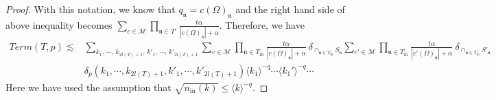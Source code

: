 \begin{proof}
With this notation, we know that $q_{\mathfrak{n}}=c(\Omega)_{\mathfrak{n}}$ and the right hand side of above inequality becomes $\sum_{c\in \mathscr{M} }\prod_{\mathfrak{n}\in T'} \frac{t\alpha}{|c(\Omega)_{\mathfrak{n}}|+\alpha}$. Therefore, we have
\begin{equation}
\begin{split}
    Term(T, p)\lesssim& \sum_{k_1,\, \cdots,\, k_{2l(T)+1},\, k'_1,\, \cdots,\, k'_{2l(T)+1}} \sum_{c\in \mathscr{M} }\prod_{\mathfrak{n}\in T_{\text{in}}}\frac{t\alpha}{|c(\Omega)_{\mathfrak{n}}|+\alpha}\ \delta_{\cap_{\mathfrak{n}\in T_{\text{in}}} S_{\mathfrak{n}}} \sum_{c'\in \mathscr{M}}\prod_{\mathfrak{n}\in T_{\text{in}}}\frac{t\alpha}{|c'(\Omega)_{\mathfrak{n}}|+\alpha}\ \delta_{\cap_{\mathfrak{n}\in T_{\text{in}}} S'_{\mathfrak{n}}} 
    \\
    &\delta_{p}(k_1,\cdots, k_{2l(T)+1}, k'_1,\cdots, k'_{2l(T)+1})\langle k_1\rangle^{-q}\cdots\langle k_1'\rangle^{-q}\cdots 
\end{split}
\end{equation}
Here we have used the assumption that $\sqrt{n_{\textrm{in}}(k)}\le \langle k\rangle^{-q}$.


\end{proof}
